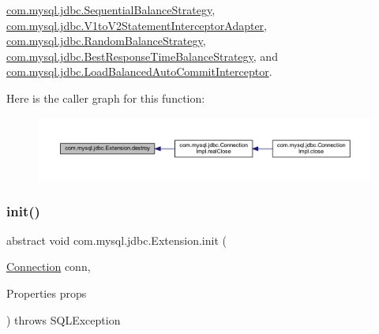 \mbox{\hyperlink{classcom_1_1mysql_1_1jdbc_1_1_sequential_balance_strategy_abccd73f5079046d6f7a183576b49fc2a}{com.\+mysql.\+jdbc.\+Sequential\+Balance\+Strategy}}, \mbox{\hyperlink{classcom_1_1mysql_1_1jdbc_1_1_v1to_v2_statement_interceptor_adapter_adca046793aea90f93e607ca0c8e7f34b}{com.\+mysql.\+jdbc.\+V1to\+V2\+Statement\+Interceptor\+Adapter}}, \mbox{\hyperlink{classcom_1_1mysql_1_1jdbc_1_1_random_balance_strategy_a74066c5f309233cd328a1724263d10e4}{com.\+mysql.\+jdbc.\+Random\+Balance\+Strategy}}, \mbox{\hyperlink{classcom_1_1mysql_1_1jdbc_1_1_best_response_time_balance_strategy_abca1d34e1d2d4a452109cec3b1d4236f}{com.\+mysql.\+jdbc.\+Best\+Response\+Time\+Balance\+Strategy}}, and \mbox{\hyperlink{classcom_1_1mysql_1_1jdbc_1_1_load_balanced_auto_commit_interceptor_aca69669db95231d8c2fff5800b62c7f7}{com.\+mysql.\+jdbc.\+Load\+Balanced\+Auto\+Commit\+Interceptor}}.

Here is the caller graph for this function\+:
\nopagebreak
\begin{figure}[H]
\begin{center}
\leavevmode
\includegraphics[width=350pt]{interfacecom_1_1mysql_1_1jdbc_1_1_extension_a7d9644de305efed5df71f3fcc7cc1772_icgraph}
\end{center}
\end{figure}
\mbox{\label{interfacecom_1_1mysql_1_1jdbc_1_1_extension_a79427811058193260bd4df0c38414e88}} 
\subsubsection{\texorpdfstring{init()}{init()}}
{\footnotesize\ttfamily abstract void com.\+mysql.\+jdbc.\+Extension.\+init (\begin{DoxyParamCaption}\item[{\mbox{\hyperlink{interfacecom_1_1mysql_1_1jdbc_1_1_connection}{Connection}}}]{conn,  }\item[{Properties}]{props }\end{DoxyParamCaption}) throws S\+Q\+L\+Exception\hspace{0.3cm}{\ttfamily [abstract]}}

